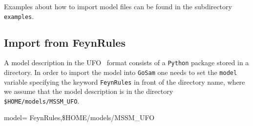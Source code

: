\documentclass[11pt,a4paper]{refrep}
\newcommand{\golem}{{\tt GoSam}\xspace}
\begin{document}
Examples about how to import model files can be found in the subdirectory 
 \texttt{examples}.

\subsection{Import from FeynRules}
A model description in the UFO~\cite{Degrande:2011} format consists of a \texttt{Python} package
stored in a directory. In order to import the model into \golem{} one needs
to set the \texttt{model} variable specifying the keyword \texttt{FeynRules}
in front of the directory name, where we assume that
the model description is in the directory \texttt{\$HOME/models/MSSM\_UFO}.
\begin{example}
model= FeynRules,\$HOME/models/MSSM\_UFO
\end{example}
\end{document}
